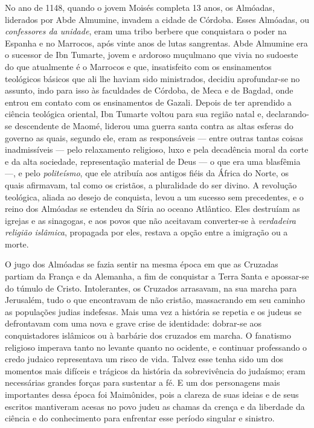 No ano de 1148, quando o jovem Moisés completa 13 anos, os Almóadas,
liderados por Abde Almumine, invadem a cidade de Córdoba. Esses
Almóadas, ou \emph{confessores da unidade}, eram uma tribo berbere que
conquistara o poder na Espanha e no Marrocos, após vinte anos de lutas
sangrentas. Abde Almumine era o sucessor de Ibn Tumarte, jovem e ardoroso
muçulmano que vivia no sudoeste do que atualmente é o Marrocos e que,
insatisfeito com os ensinamentos teológicos básicos que ali lhe haviam
sido ministrados, decidiu aprofundar-se no assunto, indo para isso às
faculdades de Córdoba, de Meca e de Bagdad, onde entrou em contato com
os ensinamentos de Gazali. Depois de ter aprendido a ciência teológica
oriental, Ibn Tumarte voltou para sua região natal e, declarando-se
descendente de Maomé, liderou uma guerra santa contra as altas esferas
do governo as quais, segundo ele, eram as responsáveis --- entre outras
tantas coisas inadmissíveis --- pelo relaxamento religioso, luxo e
pela decadência moral da corte e da alta sociedade, representação
material de Deus --- o que era uma blasfêmia ---, e pelo \emph{politeísmo},
que ele atribuía aos antigos fiéis da África do Norte, os quais
afirmavam, tal como os cristãos, a pluralidade do ser divino. A
revolução teológica, aliada ao desejo de conquista, levou a um sucesso
sem precedentes, e o reino dos Almóadas se estendeu da Síria ao oceano
Atlântico. Eles destruíam as igrejas e as sinagogas, e aos povos que
não aceitavam converter-se à \emph{verdadeira religião islâmica},
propagada por eles, restava a opção entre a imigração ou a morte.

O jugo dos Almóadas se fazia sentir na mesma época em que as Cruzadas
partiam da França e da Alemanha, a fim de conquistar a Terra Santa e
apossar-se do túmulo de Cristo. Intolerantes, os Cruzados arrasavam, na
sua marcha para Jerusalém, tudo o que encontravam de não cristão,
massacrando em seu caminho as populações judias indefesas. Mais uma vez
a história se repetia e os judeus se defrontavam com uma nova e grave
crise de identidade: dobrar-se aos conquistadores islâmicos ou à
barbárie dos cruzados em marcha. O fanatismo religioso imperava tanto
no levante quanto no ocidente, e continuar professando o credo judaico
representava um risco de vida. Talvez esse tenha sido um dos momentos
mais difíceis e trágicos da história da sobrevivência do judaísmo; eram
necessárias grandes forças para sustentar a fé. E um dos personagens
mais importantes dessa época foi Maimônides, pois a clareza de suas
ideias e de seus escritos mantiveram acesas no povo judeu as chamas da
crença e da liberdade da ciência e do conhecimento para enfrentar esse
período singular e sinistro.

